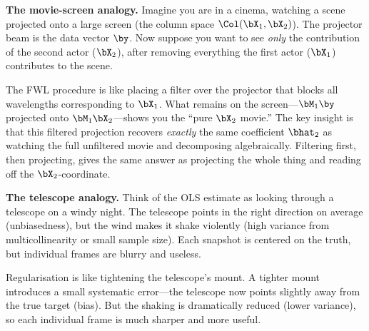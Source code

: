 

\medskip
\noindent\textbf{The movie-screen analogy.}
Imagine you are in a cinema, watching a scene projected onto a large screen
(the column space $\Col(\bX_1, \bX_2)$).
The projector beam is the data vector $\by$.
Now suppose you want to see \emph{only} the contribution of the second
actor ($\bX_2$), after removing everything the first actor ($\bX_1$)
contributes to the scene.

The FWL procedure is like placing a filter over the projector that blocks
all wavelengths corresponding to $\bX_1$.
What remains on the screen---$\bM_1 \by$ projected onto $\bM_1 \bX_2$---shows
you the ``pure $\bX_2$ movie.''
The key insight is that this filtered projection recovers \emph{exactly}
the same coefficient $\bhat_2$ as watching the full unfiltered movie
and decomposing algebraically.
Filtering first, then projecting, gives the same answer as projecting
the whole thing and reading off the $\bX_2$-coordinate.



\medskip
\noindent\textbf{The telescope analogy.}
Think of the OLS estimate as looking through a telescope on a windy night.
The telescope points in the right direction on average (unbiasedness),
but the wind makes it shake violently (high variance from
multicollinearity or small sample size).
Each snapshot is centered on the truth, but individual frames are blurry
and useless.

Regularisation is like tightening the telescope's mount.
A tighter mount introduces a small systematic error---the telescope
now points slightly away from the true target (bias).
But the shaking is dramatically reduced (lower variance), so each
individual frame is much sharper and more useful.


